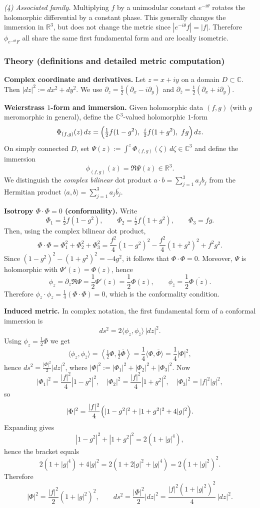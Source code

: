 \documentclass[12pt,a4paper]{article}
\theoremstyle{plain}
\theoremstyle{definition}      %
\begin{document}
\smallskip
\emph{(4) Associated family.}
Multiplying $f$ by a unimodular constant $e^{-i\theta}$ rotates the holomorphic differential by a constant phase.
This generally changes the immersion in $\mathbb R^3$, but does not change the metric since $|e^{-i\theta}f|=|f|$.
Therefore $\phi_{e^{-i\theta}F}$ all share the same first fundamental form and are locally isometric.

\medskip

\subsubsection*{Theory (definitions and detailed metric computation)}

\smallskip
\textbf{Complex coordinate and derivatives.}
Let $z=x+iy$ on a domain $D\subset\mathbb C$. Then $|dz|^2:=dx^2+dy^2$.
We use $\partial_z=\tfrac12(\partial_x-i\partial_y)$ and $\partial_{\bar z}=\tfrac12(\partial_x+i\partial_y)$.

\smallskip
\textbf{Weierstrass $1$-form and immersion.}
Given holomorphic data $(f,g)$ (with $g$ meromorphic in general), define the $\mathbb C^3$-valued holomorphic $1$-form
\[
\Phi_{(f,g)}(z)\,dz
=
\Bigl(\tfrac12 f(1-g^2),\ \tfrac{i}{2}f(1+g^2),\ fg\Bigr)\,dz.
\]
On simply connected $D$, set $\Psi(z):=\int^z \Phi_{(f,g)}(\zeta)\,d\zeta\in\mathbb C^3$ and define the immersion
\[
\phi_{(f,g)}(z)=\Re \Psi(z)\in\mathbb R^3.
\]
We distinguish the \emph{complex bilinear} dot product $a\cdot b=\sum_{j=1}^3 a_j b_j$ from the Hermitian product
$\langle a,b\rangle=\sum_{j=1}^3 a_j\overline{b_j}$.

\smallskip
\textbf{Isotropy $\Phi\cdot\Phi=0$ (conformality).}
Write
\[
\Phi_1=\tfrac12 f(1-g^2),\qquad
\Phi_2=\tfrac{i}{2}f(1+g^2),\qquad
\Phi_3=fg.
\]
Then, using the complex bilinear dot product,
\[
\Phi\cdot\Phi=\Phi_1^2+\Phi_2^2+\Phi_3^2
=
\frac{f^2}{4}(1-g^2)^2-\frac{f^2}{4}(1+g^2)^2+f^2g^2.
\]
Since $(1-g^2)^2-(1+g^2)^2=-4g^2$, it follows that $\Phi\cdot\Phi=0$.
Moreover, $\Psi$ is holomorphic with $\Psi'(z)=\Phi(z)$, hence
\[
\phi_z=\partial_z\Re\Psi=\frac12\Psi'(z)=\frac12\Phi(z),\qquad
\phi_{\bar z}=\frac12\overline{\Phi(z)}.
\]
Therefore $\phi_z\cdot\phi_z=\tfrac14(\Phi\cdot\Phi)=0$, which is the conformality condition.

\smallskip
\textbf{Induced metric.}
In complex notation, the first fundamental form of a conformal immersion is
\[
ds^2 = 2\langle \phi_z,\phi_{\bar z}\rangle\,|dz|^2.
\]
Using $\phi_z=\tfrac12\Phi$ we get
\[
\langle \phi_z,\phi_{\bar z}\rangle
=
\left\langle \tfrac12\Phi,\tfrac12\overline{\Phi}\right\rangle
=
\frac14 \langle \Phi,\overline{\Phi}\rangle
=
\frac14|\Phi|^2,
\]
hence $ds^2=\frac{|\Phi|^2}{2}|dz|^2$, where $|\Phi|^2:=|\Phi_1|^2+|\Phi_2|^2+|\Phi_3|^2$.
Now
\[
|\Phi_1|^2=\frac{|f|^2}{4}|1-g^2|^2,\quad
|\Phi_2|^2=\frac{|f|^2}{4}|1+g^2|^2,\quad
|\Phi_3|^2=|f|^2|g|^2,
\]
so
\[
|\Phi|^2
=
\frac{|f|^2}{4}\Bigl(|1-g^2|^2+|1+g^2|^2+4|g|^2\Bigr).
\]
Expanding gives
\[
|1-g^2|^2+|1+g^2|^2 = 2(1+|g|^4),
\]
hence the bracket equals
\[
2(1+|g|^4)+4|g|^2=2(1+2|g|^2+|g|^4)=2(1+|g|^2)^2.
\]
Therefore
\[
|\Phi|^2=\frac{|f|^2}{2}(1+|g|^2)^2,
\qquad
ds^2=\frac{|\Phi|^2}{2}|dz|^2
=\frac{|f|^2(1+|g|^2)^2}{4}\,|dz|^2.
\]
\end{document}

